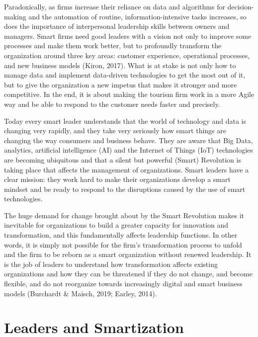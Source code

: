 \documentclass[
  letterpaper,
  DIV=11,
  numbers=noendperiod]{scrreprt}
\begin{document}
Paradoxically, as firms increase their reliance on data and algorithms
for decision-making and the automation of routine, information-intensive
tasks increases, so does the importance of interpersonal leadership
skills between owners and managers. Smart firms need good leaders with a
vision not only to improve some processes and make them work better, but
to profoundly transform the organization around three key areas:
customer experience, operational processes, and new business models
(Kiron, 2017). What is at stake is not only how to manage data and
implement data-driven technologies to get the most out of it, but to
give the organization a new impetus that makes it stronger and more
competitive. In the end, it is about making the tourism firm work in a
more Agile way and be able to respond to the customer needs faster and
precisely.

Today every smart leader understands that the world of technology and
data is changing very rapidly, and they take very seriously how smart
things are changing the way consumers and business behave. They are
aware that Big Data, analytics, artificial intelligence (AI) and the
Internet of Things (IoT) technologies are becoming ubiquitous and that a
silent but powerful (Smart) Revolution is taking place that affects the
management of organizations. Smart leaders have a clear mission: they
work hard to make their organizations develop a smart mindset and be
ready to respond to the disruptions caused by the use of smart
technologies.

The huge demand for change brought about by the Smart Revolution makes
it inevitable for organizations to build a greater capacity for
innovation and transformation, and this fundamentally affects leadership
functions. In other words, it is simply not possible for the firm's
transformation process to unfold and the firm to be reborn as a smart
organization without renewed leadership. It is the job of leaders to
understand how transformation affects existing organizations and how
they can be threatened if they do not change, and become flexible, and
do not reorganize towards increasingly digital and smart business models
(Burchardt \& Maisch, 2019; Earley, 2014).

\hypertarget{leaders-and-smartization}{%
\section{Leaders and Smartization}\label{leaders-and-smartization}}
\end{document}
